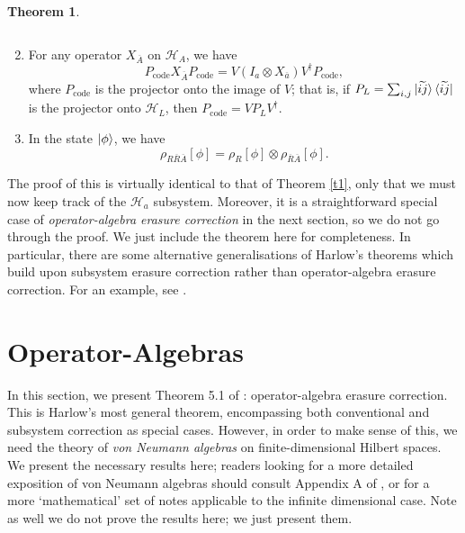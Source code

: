 \documentclass[12pt,a4paper]{report}
\numberwithin{equation}{section}
\newcommand{\ketbra}[2]{\ket{#1}\bra{#2}}
\newcommand{\ketbras}[1]{\ketbra{#1}{#1}}
\newcommand{\Pc}{P_{\text{code}}}
\newcommand{\ol}[1]{\overline{#1}}
\theoremstyle{definition}
\theoremstyle{theorem}
\newtheorem{theorem}{Theorem}[section]
\theoremstyle{theorem}
\theoremstyle{example}
\theoremstyle{definition}
\begin{document}
\begin{theorem}
\begin{enumerate}
\begin{equation}
		\end{equation}
		\item For any operator $X_{\ol{A}}$ on $\mathcal{H}_{A}$, we have
		\begin{equation}\label{S3}
			\Pc X_{\ol{A}}\Pc=V(I_{a}\otimes X_{\ol{a}})V^{\dagger}\Pc,
		\end{equation}
		where $\Pc$ is the projector onto the image of $V$; that is, if $P_{L}=\sum_{i,j}\ketbras{\widetilde{ij}}$ is the projector onto $\mathcal{H}_{L}$, then $\Pc=VP_{L}V^{\dagger}$.
		\item In the state $\ket{\phi}$, we have
		\begin{equation}\label{S4}
			\rho_{R\ol{R}\ol{A}}[\phi]=\rho_{R}[\phi]\otimes\rho_{\ol{R}\ol{A}}[\phi].
		\end{equation}
	\end{enumerate}
\end{theorem}
The proof of this is virtually identical to that of Theorem \ref{t1}, only that we must now keep track of the $\mathcal{H}_{a}$ subsystem. Moreover, it is a straightforward special case of \textit{operator-algebra erasure correction} in the next section, so we do not go through the proof. We just include the theorem here for completeness. In particular, there are some alternative generalisations of Harlow's theorems which build upon subsystem erasure correction rather than operator-algebra erasure correction. For an example, see \cite{QMS}.

\section{Operator-Algebras}
In this section, we present Theorem 5.1 of \cite{Harlow}: operator-algebra erasure correction. This is Harlow's most general theorem, encompassing both conventional and subsystem correction as special cases. However, in order to make sense of this, we need the theory of \textit{von Neumann algebras} on finite-dimensional Hilbert spaces. We present the necessary results here; readers looking for a more detailed exposition of von Neumann algebras should consult Appendix A of \cite{Harlow}, or \cite{VNA} for a more `mathematical' set of notes applicable to the infinite dimensional case. Note as well we do not prove the results here; we just present them.
\end{document}
